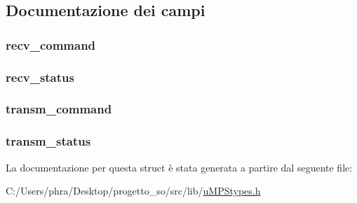 \subsection{Documentazione dei campi}
\hypertarget{structtermreg__t_aaee0ee8a649c4a4792f3ee83350db6ea}{
\subsubsection[{recv\-\_\-command}]{ recv\-\_\-command}}\label{structtermreg__t_aaee0ee8a649c4a4792f3ee83350db6ea}
\hypertarget{structtermreg__t_adb515c26e4c6508ab1a44cc43a8a91ae}{
\subsubsection[{recv\-\_\-status}]{ recv\-\_\-status}}\label{structtermreg__t_adb515c26e4c6508ab1a44cc43a8a91ae}
\hypertarget{structtermreg__t_a2b198d43d6df5503425e365297cd5444}{
\subsubsection[{transm\-\_\-command}]{ transm\-\_\-command}}\label{structtermreg__t_a2b198d43d6df5503425e365297cd5444}
\hypertarget{structtermreg__t_ab3957b0f10a0e492e4e29b90167f513d}{
\subsubsection[{transm\-\_\-status}]{ transm\-\_\-status}}\label{structtermreg__t_ab3957b0f10a0e492e4e29b90167f513d}


La documentazione per questa struct è stata generata a partire dal seguente file\-:\begin{DoxyCompactItemize}
\item 
C\-:/\-Users/phra/\-Desktop/progetto\-\_\-so/src/lib/\hyperlink{u_m_p_stypes_8h}{u\-M\-P\-Stypes.\-h}\end{DoxyCompactItemize}
